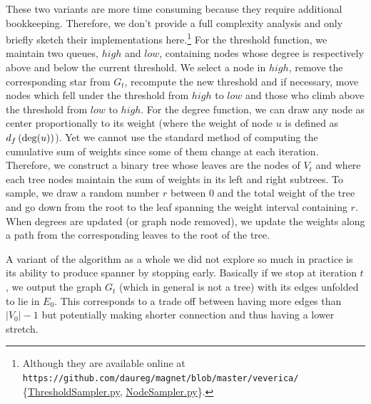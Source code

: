 These two variants are more time consuming because they require additional bookkeeping.
Therefore, we don't provide a full complexity analysis and only briefly sketch their implementations
here.\footnote{Although they are available online at
\nolinkurl{https://github.com/daureg/magnet/blob/master/veverica/}%
\{\href{https://github.com/daureg/magnet/blob/master/veverica/ThresholdSampler.py}%
{ThresholdSampler.py}, \href{https://github.com/daureg/magnet/blob/master/veverica/NodeSampler.py}%
{NodeSampler.py}\}.} For the threshold function, we
maintain two queues, $high$ and $low$, containing nodes whose degree is respectively above and below
the current threshold. We select a node \uar{} in $high$, remove the corresponding star from $G_t$,
recompute the new threshold and if necessary, move nodes which fell under the threshold from $high$
to $low$ and those who climb above the threshold from $low$ to $high$. For the degree function, we
can draw any node as center proportionally to its weight (where the weight of node $u$ is defined as
$d_f\left(\operatorname{deg}(u)\right)$). Yet we cannot use the standard method of computing the cumulative sum
of weights since some of them change at each iteration. Therefore, we construct a binary tree whose
leaves are the nodes of $V_t$ and where each tree nodes maintain the sum of weights in its left and
right subtrees. To sample, we draw a random number $r$ between $0$ and the total weight of the tree and
go down from the root to the leaf spanning the weight interval containing $r$.
When degrees are updated (or graph node removed), we update the weights along a path from the
corresponding leaves to the root of the tree.

A variant of the \gtx{} algorithm as a whole we did not explore so much in practice is its ability
to produce spanner by stopping early. Basically if we stop at iteration $t$, we output the graph
$G_t$ (which in general is not a tree) with its edges unfolded to lie in $E_0$. This corresponds to
a trade off between having more edges than $|V_0|-1$ but potentially making shorter connection and
thus having a lower stretch.
